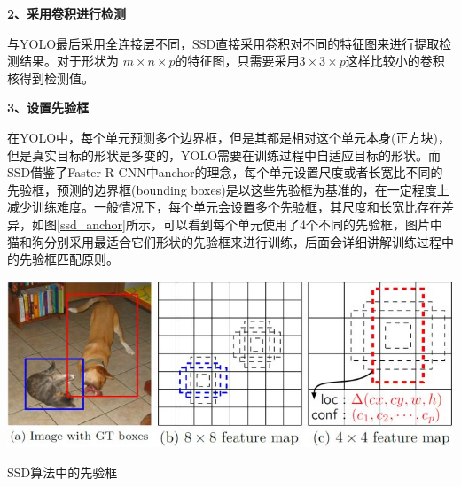 \textbf{2、采用卷积进行检测}

与YOLO最后采用全连接层不同，SSD直接采用卷积对不同的特征图来进行提取检测结果。对于形状为 $m\times n \times p $的特征图，只需要采用$ 3\times 3 \times p $这样比较小的卷积核得到检测值。 

\textbf{3、设置先验框 }

在YOLO中，每个单元预测多个边界框，但是其都是相对这个单元本身(正方块)，但是真实目标的形状是多变的，YOLO需要在训练过程中自适应目标的形状。而SSD借鉴了Faster R-CNN中anchor的理念，每个单元设置尺度或者长宽比不同的先验框，预测的边界框(bounding boxes)是以这些先验框为基准的，在一定程度上减少训练难度。一般情况下，每个单元会设置多个先验框，其尺度和长宽比存在差异，如图\ref{ssd_anchor}所示，可以看到每个单元使用了4个不同的先验框，图片中猫和狗分别采用最适合它们形状的先验框来进行训练，后面会详细讲解训练过程中的先验框匹配原则。
\begin{uscfigure}
	\includegraphics[width=\textwidth]{./Pictures/ssd_(3).jpg}	
	\caption{SSD算法中的先验框}
	\label{ssd_anchor}
\end{uscfigure}